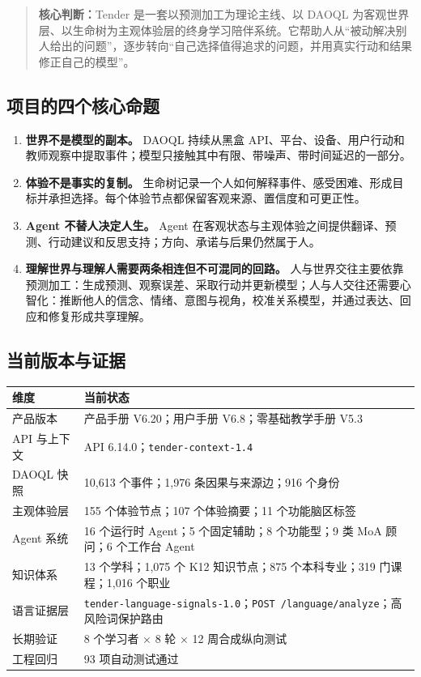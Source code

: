 \documentclass[UTF8,a4paper,11pt]{ctexart}
\newcommand{\keypoint}[1]{\begin{quote}\noindent\textbf{\color{TenderBlue}核心判断：}#1\end{quote}}
\begin{document}
\keypoint{Tender 是一套以预测加工为理论主线、以 DAOQL 为客观世界层、以生命树为主观体验层的终身学习陪伴系统。它帮助人从“被动解决别人给出的问题”，逐步转向“自己选择值得追求的问题，并用真实行动和结果修正自己的模型”。}

\subsection{项目的四个核心命题}

\begin{enumerate}
\item \textbf{世界不是模型的副本。} DAOQL 持续从黑盒 API、平台、设备、用户行动和教师观察中提取事件；模型只接触其中有限、带噪声、带时间延迟的一部分。
\item \textbf{体验不是事实的复制。} 生命树记录一个人如何解释事件、感受困难、形成目标并承担选择。每个体验节点都保留客观来源、置信度和可更正性。
\item \textbf{Agent 不替人决定人生。} Agent 在客观状态与主观体验之间提供翻译、预测、行动建议和反思支持；方向、承诺与后果仍然属于人。
\item \textbf{理解世界与理解人需要两条相连但不可混同的回路。} 人与世界交往主要依靠预测加工：生成预测、观察误差、采取行动并更新模型；人与人交往还需要心智化：推断他人的信念、情绪、意图与视角，校准关系模型，并通过表达、回应和修复形成共享理解。
\end{enumerate}

\subsection{当前版本与证据}

\begin{center}
\begin{tabularx}{\textwidth}{@{}p{4.6cm}X@{}}
\toprule
\textbf{维度} & \textbf{当前状态} \\
\midrule
产品版本 & 产品手册 V6.20；用户手册 V6.8；零基础教学手册 V5.3 \\
API 与上下文 & API 6.14.0；\texttt{tender-context-1.4} \\
DAOQL 快照 & 10,613 个事件；1,976 条因果与来源边；916 个身份 \\
主观体验层 & 155 个体验节点；107 个体验摘要；11 个功能脑区标签 \\
Agent 系统 & 16 个运行时 Agent；5 个固定辅助；8 个功能型；9 类 MoA 顾问；6 个工作台 Agent \\
知识体系 & 13 个学科；1,075 个 K12 知识节点；875 个本科专业；319 门课程；1,016 个职业 \\
语言证据层 & \texttt{tender-language-signals-1.0}；\texttt{POST /language/analyze}；高风险词保护路由 \\
长期验证 & 8 个学习者 × 8 轮 × 12 周合成纵向测试 \\
工程回归 & 93 项自动测试通过 \\
\bottomrule
\end{tabularx}
\end{center}
\end{document}
